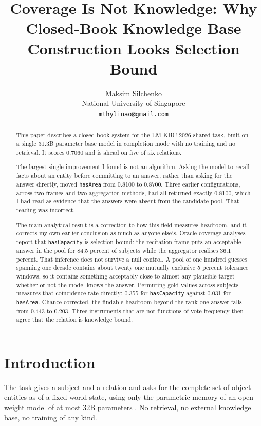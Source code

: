 \documentclass[11pt]{article}
\title{Coverage Is Not Knowledge: Why Closed-Book Knowledge Base\\Construction Looks Selection Bound}
\author{Maksim Silchenko \\
  National University of Singapore \\
  \texttt{mthylinao@gmail.com}}
\begin{document}
\maketitle

\begin{abstract}
This paper describes a closed-book system for the LM-KBC 2026 shared task, built
on a single 31.3B parameter base model in completion mode with no training and no
retrieval. It scores 0.7060 and is ahead on five of six relations.

The largest single improvement I found is not an algorithm. Asking the model to
recall facts about an entity before committing to an answer, rather than asking
for the answer directly, moved \texttt{hasArea} from 0.8100 to 0.8700. Three
earlier configurations, across two frames and two aggregation methods, had all
returned exactly 0.8100, which I had read as evidence that the answers were
absent from the candidate pool. That reading was incorrect.

The main analytical result is a correction to how this field measures headroom,
and it corrects my own earlier conclusion as much as anyone else's. Oracle
coverage analyses report that \texttt{hasCapacity} is selection bound: the
recitation frame puts an acceptable answer in the pool for 84.5 percent of
subjects while the aggregator realises 36.1 percent. That inference does not
survive a null control. A pool of one hundred guesses spanning one decade
contains about twenty one mutually exclusive 5 percent tolerance windows, so it
contains something acceptably close to almost any plausible target whether or
not the model knows the answer. Permuting gold values across subjects measures
that coincidence rate directly: 0.355 for \texttt{hasCapacity} against 0.031 for
\texttt{hasArea}. Chance corrected, the findable headroom beyond the rank one
answer falls from 0.443 to 0.203. Three instruments that are not functions of
vote frequency then agree that the relation is knowledge bound.
\end{abstract}

\section{Introduction}

The task gives a subject and a relation and asks for the complete set of object
entities as of a fixed world state, using only the parametric memory of an open
weight model of at most 32B parameters \cite{singhania2022lmkbc,kalo2025lmkbc}.
No retrieval, no external knowledge base, no training of any kind.
\end{document}
